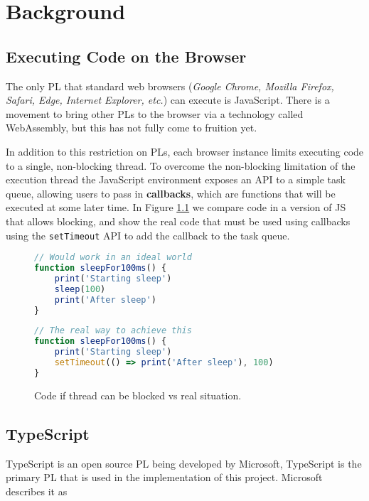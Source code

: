 \chapter{Background}

\section{Executing Code on the Browser}

The only PL that standard web browsers (\emph{Google Chrome, Mozilla Firefox, Safari, Edge, Internet Explorer, etc.}) can execute is JavaScript. There is a movement to bring other PLs to the browser via a technology called WebAssembly, but this has not fully come to fruition yet.  

In addition to this restriction on PLs, each browser instance limits executing code to a single, non-blocking thread.
To overcome the non-blocking limitation of the execution thread the JavaScript environment exposes an API to a simple task queue, allowing users to pass in \textbf{callbacks}, which are functions that will be executed at some later time. In Figure \ref{blockingcode} we compare code in a version of JS that allows blocking, and show the real code that must be used using callbacks using the \texttt{setTimeout} API to add the callback to the task queue.

\begin{figure}[ht]
    \caption{Code if thread can be blocked vs real situation.}
    \label{blockingcode}
    \begin{minipage}[t]{0.45\textwidth}
        \begin{lstlisting}[language=javascript]
// Would work in an ideal world
function sleepFor100ms() {
    print('Starting sleep')
    sleep(100)
    print('After sleep')
}
        \end{lstlisting}
    \end{minipage}\qquad
    \begin{minipage}[t]{0.45\textwidth}
        \begin{lstlisting}[language=javascript]
// The real way to achieve this
function sleepFor100ms() {
    print('Starting sleep')
    setTimeout(() => print('After sleep'), 100)
}
        \end{lstlisting}
    \end{minipage}
\end{figure}

\section{TypeScript}
TypeScript is an open source PL being developed by Microsoft, TypeScript is the primary PL that is used in the implementation of this project. Microsoft describes it as

